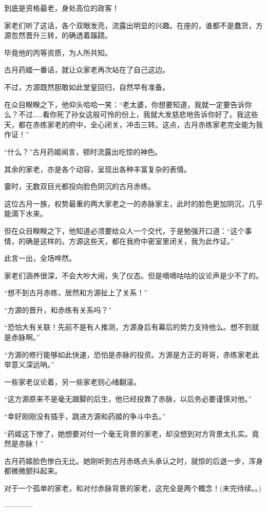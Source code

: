 \begin{this_body}
到底是资格最老，身处高位的政客！

家老们听了这话，各个双眼发亮，流露出明显的兴趣。在座的，谁都不是蠢货，方源忽然晋升三转，的确透着蹊跷。

毕竟他的丙等资质，为人所共知。

古月药姬一番话，就让众家老再次站在了自己这边。

不过，方源既然胆敢如此堂皇回归，自然早有准备。

在众目睽睽之下，他仰头哈哈一笑：“老太婆，你想要知道，我就一定要告诉你么？不过……看你死了孙女这般可怜的份上，我就大发慈悲地告诉你好了。我这些天，都在赤练家老的府中，全心闭关，冲击三转。这点，古月赤练家老完全能为我作证！”

“什么？”古月药姬闻言，顿时流露出吃惊的神色。

其余的家老，亦是各个动容，呈现出各种丰富复杂的表情。

霎时，无数双目光都投向脸色阴沉的古月赤练。

这位古月一族，权势最重的两大家老之一的赤脉家主，此时的脸色更加阴沉，几乎能滴下水来。

但在众目睽睽之下，他知道必须要给众人一个交代，于是勉强开口道：“这个事情，的确是这样的。方源这些天，都在我府中密室里闭关，我为此作证。”

此言一出，全场哗然。

家老们涵养很深，不会大吵大闹，失了仪态。但是嘀嘀咕咕的议论声是少不了的。

“想不到古月赤练，居然和方源扯上了关系！”

“方源的晋升，和赤练有关系吗？”

“恐怕大有关联！先前不是有人推测，方源身后有幕后的势力支持他么。想不到就是赤脉啊。”

“方源的修行能够如此快速，恐怕是赤脉的投资。方源是方正的哥哥，赤练家老此举意义深远呐。”

一些家老议论着，另一些家老则心绪翻滚。

“这方源原来不是毫无跟脚的后生，他已经投靠了赤脉，以后务必要谨慎对他。”

“幸好刚刚没有插手，跳进方源和药姬的争斗中去。”

“药姬这下惨了，她想要对付一个毫无背景的家老，却没想到对方背景太扎实。竟然是赤脉！”

古月药姬脸色惨白无比。她刚听到古月赤练点头承认之时，就惊的后退一步，浑身都微微颤抖起来。

对于一个孤单的家老，和对付赤脉背景的家老，这完全是两个概念！(未完待续。。)

------------

\end{this_body}

